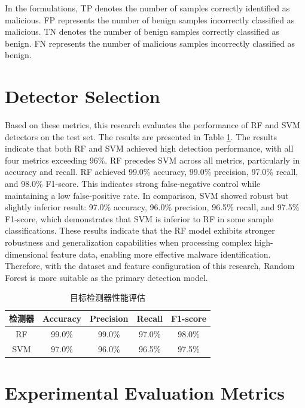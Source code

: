 In the formulations, TP denotes the number of samples correctly identified as malicious. FP represents the number of benign samples incorrectly classified as malicious. TN denotes the number of benign samples correctly classified as benign. FN represents the number of malicious samples incorrectly classified as benign.

\section{Detector Selection}

Based on these metrics, this research evaluates the performance of RF and SVM detectors on the test set. The results are presented in Table \ref{tab:5.4}. The results indicate that both RF and SVM achieved high detection performance, with all four metrics exceeding 96\%. RF precedes SVM across all metrics, particularly in accuracy and recall. RF achieved 99.0\% accuracy, 99.0\% precision, 97.0\% recall, and 98.0\% F1-score. This indicates strong false-negative control while maintaining a low false-positive rate. In comparison, SVM showed robust but slightly inferior result: 97.0\% accuracy, 96.0\% precision, 96.5\% recall, and 97.5\% F1-score, which demonstrates that SVM is inferior to RF in some sample classifications. These results indicate that the RF model exhibits stronger robustness and generalization capabilities when processing complex high-dimensional feature data, enabling more effective malware identification. Therefore, with the dataset and feature configuration of this research, Random Forest is more suitable as the primary detection model.

\begin{table}[htbp]
	\centering
	\caption{目标检测器性能评估}
	\label{tab:5.4}
	\renewcommand{\arraystretch}{1.3}
	\begin{tabular*}{0.9\textwidth}{@{\extracolsep{\fill}}ccccc}
		\toprule
		检测器 & Accuracy & Precision & Recall & F1-score \\
		\midrule
		RF  & 99.0\% & 99.0\% & 97.0\% & 98.0\% \\
		SVM & 97.0\% & 96.0\% & 96.5\% & 97.5\% \\
		\bottomrule
	\end{tabular*}
\end{table}

\section{Experimental Evaluation Metrics}

